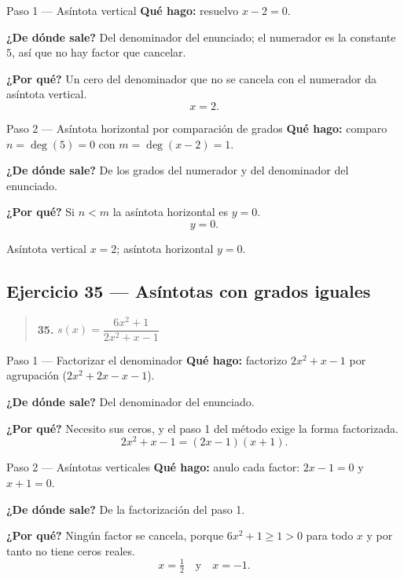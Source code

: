 \documentclass[11pt]{article}
\begin{document}
\begin{paso}{Paso 1 --- Asíntota vertical}
\textbf{Qué hago:} resuelvo $x-2=0$.

\textbf{¿De dónde sale?} Del denominador del enunciado; el numerador es la constante $5$, así que no hay factor que cancelar.

\textbf{¿Por qué?} Un cero del denominador que no se cancela con el numerador da asíntota vertical.
\[
x=2 .
\]
\end{paso}

\begin{paso}{Paso 2 --- Asíntota horizontal por comparación de grados}
\textbf{Qué hago:} comparo $n=\deg(5)=0$ con $m=\deg(x-2)=1$.

\textbf{¿De dónde sale?} De los grados del numerador y del denominador del enunciado.

\textbf{¿Por qué?} Si $n<m$ la asíntota horizontal es $y=0$.
\[
y=0 .
\]
\end{paso}

\begin{resp}
Asíntota vertical $x=2$; asíntota horizontal $y=0$.
\end{resp}

\subsection*{Ejercicio 35 — Asíntotas con grados iguales}

\begin{quote}
\textbf{35.} $s(x)=\dfrac{6x^2+1}{2x^2+x-1}$
\end{quote}

\begin{paso}{Paso 1 --- Factorizar el denominador}
\textbf{Qué hago:} factorizo $2x^2+x-1$ por agrupación ($2x^2+2x-x-1$).

\textbf{¿De dónde sale?} Del denominador del enunciado.

\textbf{¿Por qué?} Necesito sus ceros, y el paso 1 del método exige la forma factorizada.
\[
2x^2+x-1=(2x-1)(x+1).
\]
\end{paso}

\begin{paso}{Paso 2 --- Asíntotas verticales}
\textbf{Qué hago:} anulo cada factor: $2x-1=0$ y $x+1=0$.

\textbf{¿De dónde sale?} De la factorización del paso 1.

\textbf{¿Por qué?} Ningún factor se cancela, porque $6x^2+1\ge 1>0$ para todo $x$ y por tanto no tiene ceros reales.
\[
x=\tfrac12 \quad\text{y}\quad x=-1 .
\]
\end{paso}
\end{document}

